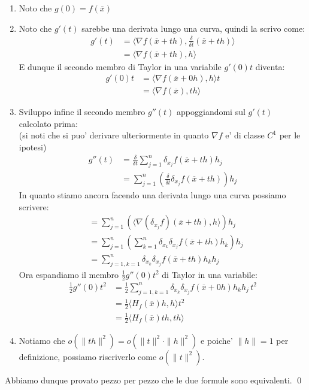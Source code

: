 \documentclass{article}
\begin{document}
\begin{enumerate}
  \item Noto che $g(0) = f(\overline{x})$
  \item Noto che $g'(t)$ sarebbe una derivata lungo una curva, quindi la scrivo come:
    \begin{align*}
      g'(t) &= \langle \nabla f(\overline{x} + th), \frac{\delta}{\delta t}(\overline{x} + th) \rangle \\
      &= \langle \nabla f(\overline{x} + th), h \rangle
    \end{align*}
    E dunque il secondo membro di Taylor in una variabile $g'(0)t$ diventa:
    \begin{align*}
      g'(0)t &= \langle \nabla f(\overline{x} + 0h), h \rangle t \\
      &= \langle \nabla f(\overline{x}), th \rangle
    \end{align*}
  \item Sviluppo infine il secondo membro $g''(t)$ appoggiandomi sul $g'(t)$ calcolato prima: \\
    (si noti che si puo' derivare ulteriormente in quanto $\nabla f$ e' di classe $C^1$ per le ipotesi)
    \begin{align*}
      g''(t) &= \frac{\delta}{\delta t} \sum_{j=1}^n \delta_{x_j} f(\overline{x} + th) h_j \\
      &= \sum_{j=1}^n (\frac{\delta}{\delta t} \delta_{x_j} f(\overline{x} + th)) h_j
    \end{align*}
    In quanto stiamo ancora facendo una derivata lungo una curva possiamo scrivere:
    \begin{align*}
      &= \sum_{j=1}^n (\langle \nabla (\delta_{x_j} f)(\overline{x} + th), h \rangle) h_j \\
      &= \sum_{j=1}^n (\sum_{k=1}^n \delta_{x_k} \delta_{x_j} f(\overline{x} + th) h_k) h_j \\
      &= \sum_{j=1,k=1}^n \delta_{x_k} \delta_{x_j} f(\overline{x} + th) h_k h_j
    \end{align*}
    Ora espandiamo il membro $\frac{1}{2} g''(0)t^2$ di Taylor in una variabile:
    \begin{align*}
      \frac{1}{2} g''(0) t^2 &= \frac{1}{2} \sum_{j=1,k=1}^n \delta_{x_k} \delta_{x_j} f(\overline{x} + 0h) h_k h_j \, t^2\\
      &= \frac{1}{2} \langle H_f(\overline{x}) h, h \rangle t^2 \\
      &= \frac{1}{2} \langle H_f(\overline{x}) th, th \rangle
    \end{align*}
  \item Notiamo che $o(\|th\|^2) = o(\|t\|^2 \cdot \|h\|^2)$ e poiche' $\|h\| = 1$
    per definizione, possiamo riscriverlo come $o(\|t\|^2)$.
\end{enumerate}
Abbiamo dunque provato pezzo per pezzo che le due formule sono equivalenti. \qed
\end{document}
